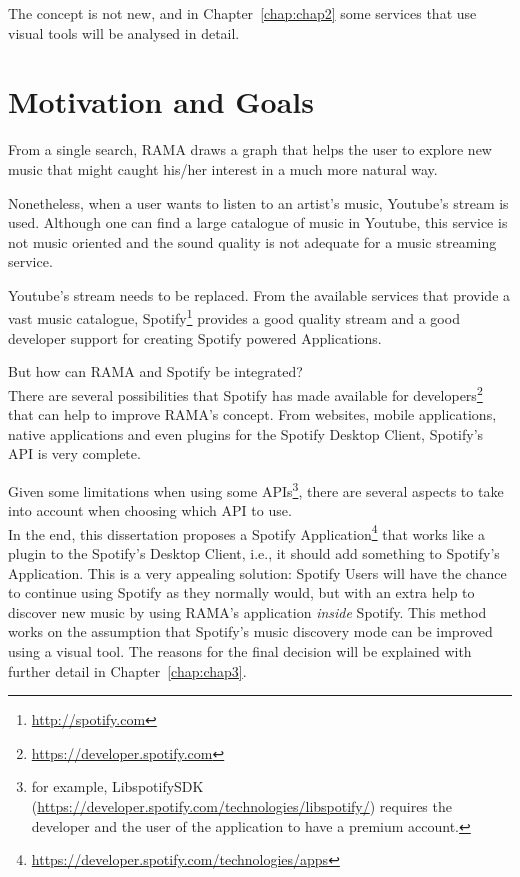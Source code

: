   The concept is not new, and in Chapter~\ref{chap:chap2} some services that use visual tools will be analysed in detail.


\section{Motivation and Goals} \label{sec:goals}

  From a single search, RAMA draws a graph that helps the user to explore new music that might caught his/her interest in a much more natural way.

  Nonetheless, when a user wants to listen to an artist's music, Youtube's stream is used.
  Although one can find a large catalogue of music in Youtube, this service is not music oriented and the sound quality is not adequate for a music streaming service.

  Youtube's stream needs to be replaced.
  From the available services that provide a vast music catalogue, Spotify\footnote{\url{http://spotify.com}} provides a good quality stream and a good developer support for creating Spotify powered Applications.

  But how can RAMA and Spotify be integrated? \\

  There are several possibilities that Spotify has made available for developers\footnote{\url{https://developer.spotify.com}} that can help to improve RAMA's concept.
  From websites, mobile applications, native applications and even plugins for the Spotify Desktop Client, Spotify's API is very complete.

  Given some limitations when using some APIs\footnote{for example, LibspotifySDK (\url{https://developer.spotify.com/technologies/libspotify/}) requires the developer and the user of the application to have a premium account.}, there are several aspects to take into account when choosing which API to use. \\

  In the end, this dissertation proposes a Spotify Application\footnote{\url{https://developer.spotify.com/technologies/apps}} that works like a plugin to the Spotify's Desktop Client, i.e., it should add something to Spotify's Application.
  This is a very appealing solution: Spotify Users will have the chance to continue using Spotify as they normally would, but with an extra help to discover new music by using RAMA's application \emph{inside} Spotify. 
  This method works on the assumption that Spotify's music discovery mode can be improved using a visual tool.
  The reasons for the final decision will be explained with further detail in Chapter~\ref{chap:chap3}. \\

